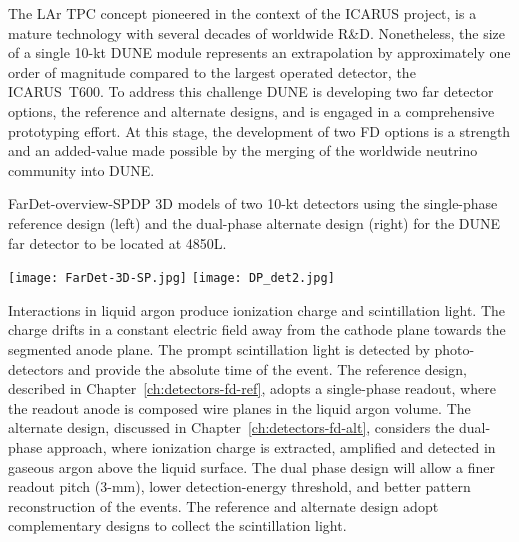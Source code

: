 The LAr TPC concept pioneered in the context of the ICARUS project, is
a mature technology with several decades of worldwide R\&D.
Nonetheless, the size of a single 10-kt DUNE module represents an
extrapolation by approximately one order of magnitude compared to the
largest operated detector, the ICARUS~T600. To address this challenge
DUNE is developing two far detector options, the reference and
alternate designs, and is engaged in a comprehensive prototyping
effort. At this stage, the development of two FD options is a strength
and an added-value made possible by the merging of the worldwide
neutrino community into DUNE.

\begin{cdrfigure}{FarDet-overview-SPDP}
{3D models of two 10-kt detectors using the single-phase reference design (left) 
and the dual-phase alternate design (right) for the DUNE far detector to be 
located at 4850L.}
\centering
\begin{minipage}[b]{1.0\textwidth}
\begin{center}
\texttt{[image: FarDet-3D-SP.jpg]}
\texttt{[image: DP\_det2.jpg]}
\end{center}
\end{minipage}
\end{cdrfigure}

Interactions in liquid argon produce ionization charge and
scintillation light.  The charge drifts in a constant electric field
away from the cathode plane towards the segmented anode plane.  The
prompt scintillation light is detected by photo-detectors and provide
the absolute time of the event.  The reference design, described in
Chapter~\ref{ch:detectors-fd-ref}, adopts a single-phase readout,
where the readout anode is composed wire planes in the liquid argon
volume.  The alternate design, discussed in
Chapter~\ref{ch:detectors-fd-alt}, considers the dual-phase approach,
where ionization charge is extracted, amplified and detected in
gaseous argon above the liquid surface.  The dual phase design will
allow a finer readout pitch (3-mm), lower detection-energy threshold,
and better pattern reconstruction of the events.  The reference and
alternate design adopt complementary designs to collect the
scintillation light.

